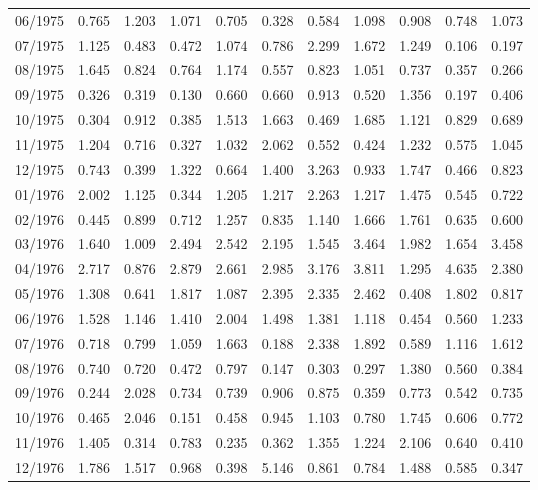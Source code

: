 \begin{tabular}{lrrrrrrrrrr}
06/1975 &  0.765 &  1.203 &  1.071 &  0.705 &  0.328 &  0.584 &  1.098 &  0.908 &  0.748 &  1.073 \\
07/1975 &  1.125 &  0.483 &  0.472 &  1.074 &  0.786 &  2.299 &  1.672 &  1.249 &  0.106 &  0.197 \\
08/1975 &  1.645 &  0.824 &  0.764 &  1.174 &  0.557 &  0.823 &  1.051 &  0.737 &  0.357 &  0.266 \\
09/1975 &  0.326 &  0.319 &  0.130 &  0.660 &  0.660 &  0.913 &  0.520 &  1.356 &  0.197 &  0.406 \\
10/1975 &  0.304 &  0.912 &  0.385 &  1.513 &  1.663 &  0.469 &  1.685 &  1.121 &  0.829 &  0.689 \\
11/1975 &  1.204 &  0.716 &  0.327 &  1.032 &  2.062 &  0.552 &  0.424 &  1.232 &  0.575 &  1.045 \\
12/1975 &  0.743 &  0.399 &  1.322 &  0.664 &  1.400 &  3.263 &  0.933 &  1.747 &  0.466 &  0.823 \\
01/1976 &  2.002 &  1.125 &  0.344 &  1.205 &  1.217 &  2.263 &  1.217 &  1.475 &  0.545 &  0.722 \\
02/1976 &  0.445 &  0.899 &  0.712 &  1.257 &  0.835 &  1.140 &  1.666 &  1.761 &  0.635 &  0.600 \\
03/1976 &  1.640 &  1.009 &  2.494 &  2.542 &  2.195 &  1.545 &  3.464 &  1.982 &  1.654 &  3.458 \\
04/1976 &  2.717 &  0.876 &  2.879 &  2.661 &  2.985 &  3.176 &  3.811 &  1.295 &  4.635 &  2.380 \\
05/1976 &  1.308 &  0.641 &  1.817 &  1.087 &  2.395 &  2.335 &  2.462 &  0.408 &  1.802 &  0.817 \\
06/1976 &  1.528 &  1.146 &  1.410 &  2.004 &  1.498 &  1.381 &  1.118 &  0.454 &  0.560 &  1.233 \\
07/1976 &  0.718 &  0.799 &  1.059 &  1.663 &  0.188 &  2.338 &  1.892 &  0.589 &  1.116 &  1.612 \\
08/1976 &  0.740 &  0.720 &  0.472 &  0.797 &  0.147 &  0.303 &  0.297 &  1.380 &  0.560 &  0.384 \\
09/1976 &  0.244 &  2.028 &  0.734 &  0.739 &  0.906 &  0.875 &  0.359 &  0.773 &  0.542 &  0.735 \\
10/1976 &  0.465 &  2.046 &  0.151 &  0.458 &  0.945 &  1.103 &  0.780 &  1.745 &  0.606 &  0.772 \\
11/1976 &  1.405 &  0.314 &  0.783 &  0.235 &  0.362 &  1.355 &  1.224 &  2.106 &  0.640 &  0.410 \\
12/1976 &  1.786 &  1.517 &  0.968 &  0.398 &  5.146 &  0.861 &  0.784 &  1.488 &  0.585 &  0.347 \\

\end{tabular}
